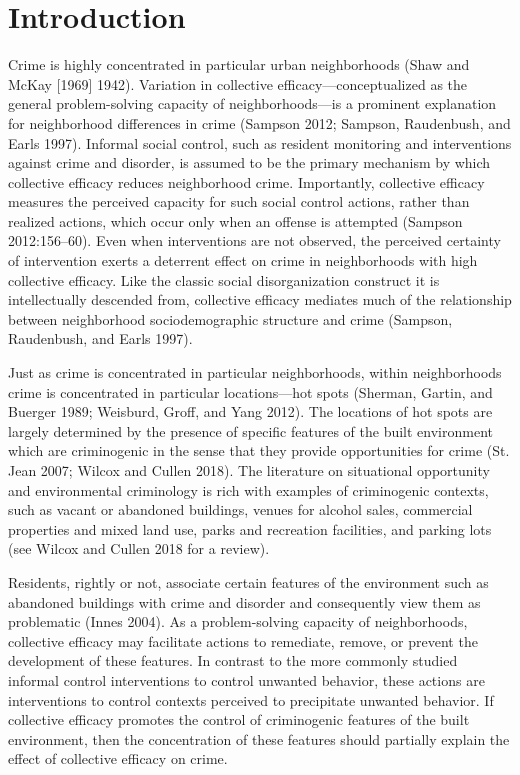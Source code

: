 \documentclass [11pt, proquest] {uwthesis}[2015/03/03]
\begin{document}
\hypertarget{introduction-2}{%
\section{Introduction}\label{introduction-2}}

\noindent Crime is highly concentrated in particular urban neighborhoods (Shaw and McKay {[}1969{]} 1942). Variation in collective efficacy---conceptualized as the general problem-solving capacity of neighborhoods---is a prominent explanation for neighborhood differences in crime (Sampson 2012; Sampson, Raudenbush, and Earls 1997). Informal social control, such as resident monitoring and interventions against crime and disorder, is assumed to be the primary mechanism by which collective efficacy reduces neighborhood crime. Importantly, collective efficacy measures the perceived capacity for such social control actions, rather than realized actions, which occur only when an offense is attempted (Sampson 2012:156--60). Even when interventions are not observed, the perceived certainty of intervention exerts a deterrent effect on crime in neighborhoods with high collective efficacy. Like the classic social disorganization construct it is intellectually descended from, collective efficacy mediates much of the relationship between neighborhood sociodemographic structure and crime (Sampson, Raudenbush, and Earls 1997).

Just as crime is concentrated in particular neighborhoods, within neighborhoods crime is concentrated in particular locations---hot spots (Sherman, Gartin, and Buerger 1989; Weisburd, Groff, and Yang 2012). The locations of hot spots are largely determined by the presence of specific features of the built environment which are criminogenic in the sense that they provide opportunities for crime (St. Jean 2007; Wilcox and Cullen 2018). The literature on situational opportunity and environmental criminology is rich with examples of criminogenic contexts, such as vacant or abandoned buildings, venues for alcohol sales, commercial properties and mixed land use, parks and recreation facilities, and parking lots (see Wilcox and Cullen 2018 for a review).

Residents, rightly or not, associate certain features of the environment such as abandoned buildings with crime and disorder and consequently view them as problematic (Innes 2004). As a problem-solving capacity of neighborhoods, collective efficacy may facilitate actions to remediate, remove, or prevent the development of these features. In contrast to the more commonly studied informal control interventions to control unwanted behavior, these actions are interventions to control contexts perceived to precipitate unwanted behavior. If collective efficacy promotes the control of criminogenic features of the built environment, then the concentration of these features should partially explain the effect of collective efficacy on crime.
\end{document}

